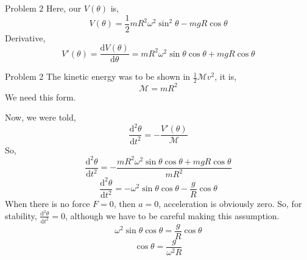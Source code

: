 \documentclass[9pt,serif]{beamer}
\begin{document}
\begin{frame}
    {Problem 2}
    Here, our $V(\theta)$ is, 
    \[ V(\theta) = \frac{1}{2} m R^2 \omega ^2 \sin^2\theta - mg R \cos \theta \]
    Derivative,
    \[ V'(\theta) = \frac{\mathrm{d} V(\theta)}{\mathrm{d} \theta} =
    mR^2 \omega^2 \sin \theta \cos \theta + mg R \cos\theta  \]
    
\end{frame}

\begin{frame}
    {Problem 2}
    The kinetic energy was to be shown in $\frac{1}{2} \mathcal{M} v^2$, it is,
    \[ \mathcal{M} = mR^2 \]
    We need this form. 
\end{frame}

\begin{frame}
    Now, we were told, 
    \[ \frac{\mathrm{d} ^2 \theta}{\mathrm{d} t^2}= -
    \frac{V'(\theta) }{\mathcal{M}}\]
    So, 
    \[ \frac{\mathrm{d} ^2 \theta}{\mathrm{d} t^2} =
    - \frac{mR^2 \omega^2 \sin \theta \cos \theta + mgR \cos \theta }{mR^2}\]
   \pause
  { \[ \frac{\mathrm{d} ^2 \theta }{\mathrm{d} t^2} = -
  \omega^2 \sin \theta \cos \theta - \frac{g}{R} \cos \theta \]}
   \pause
   When there is no force $F =0$, then $a=0$, acceleration is obviously zero. So, for stability, $\frac{\mathrm{d} ^2 \theta}{\mathrm{d}  t^2} = 0$, although we have to be careful making this assumption. 
    \[  \omega^2 \sin \theta \cos \theta = \frac{g}{R} \cos \theta \]
    \[ \boxed{ \cos \theta = \frac{g}{\omega^2 R} }\]
   
   
\end{frame}
\end{document}
